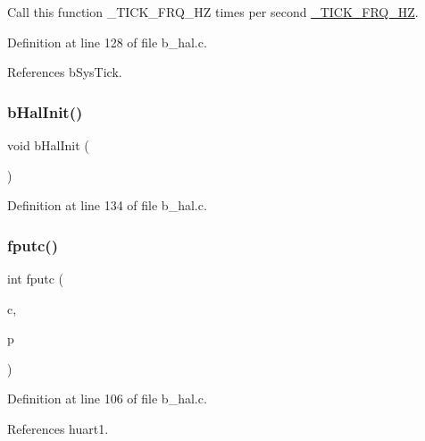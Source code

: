 Call this function \+\_\+\+T\+I\+C\+K\+\_\+\+F\+R\+Q\+\_\+\+HZ times per second \mbox{\hyperlink{b__config_8h_ae2076738df8e2eff78366a0187291367}{\+\_\+\+T\+I\+C\+K\+\_\+\+F\+R\+Q\+\_\+\+HZ}}. 



Definition at line 128 of file b\+\_\+hal.\+c.



References b\+Sys\+Tick.

\mbox{\label{group___h_a_l___exported___functions_ga67c9cec578e4150ae30c526e88e60f97}} 
\subsubsection{\texorpdfstring{b\+Hal\+Init()}{bHalInit()}}
{\footnotesize\ttfamily void b\+Hal\+Init (\begin{DoxyParamCaption}{ }\end{DoxyParamCaption})}



Definition at line 134 of file b\+\_\+hal.\+c.

\mbox{\label{group___h_a_l___exported___functions_gaf709c07e26adbffa5d9984b2cec63c69}} 
\subsubsection{\texorpdfstring{fputc()}{fputc()}}
{\footnotesize\ttfamily int fputc (\begin{DoxyParamCaption}\item[{int}]{c,  }\item[{F\+I\+LE $\ast$}]{p }\end{DoxyParamCaption})}



Definition at line 106 of file b\+\_\+hal.\+c.



References huart1.

